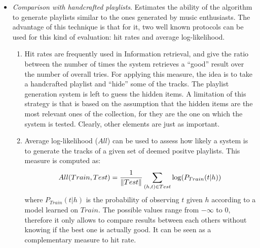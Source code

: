 \begin{itemize}
\item \textit{Comparison with handcrafted playlists}. Estimates the ability of the algorithm to generate playlists similar to the ones generated by music enthusiasts. The advantage of this technique is that for it, two well known protocols can be used for this kind of evaluation: hit rates and average log-likelihood. 
\begin{enumerate}
\item Hit rates are frequently used in Information retrieval, and give the ratio between the number of times the system retrieves a ``good'' result over the number of overall tries. For applying this measure, the idea is to take a handcrafted playlist and ``hide'' some of the tracks. The playlist generation system is left to guess the hidden items. A limitation of this strategy is that is based on the assumption that the hidden items are the most relevant ones of the collection, for they are the one on which the system is tested. Clearly, other elements are just as important. 
\item Average log-likelihood ($All$) can be used to assess how likely a system is to generate the tracks of a given set of deemed positve playlists. This measure is computed as:
\begin{equation}
All(Train, Test) = \frac{1}{\lVert Test\rVert} \sum\limits_{(h,t) \in Test}^{} \log (P_{Train} (t | h))
\end{equation}
where $P_{Train}(t|h)$ is the probability of observing $t$ given $h$ according to a model learned on $Train$. The possible values range from $- \infty$ to 0, therefore it only allows to compare results between each others without knowing if the best one is actually good. It can be seen as a complementary measure to hit rate.
\end{enumerate}
\end{itemize}

